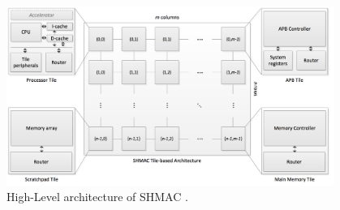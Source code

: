 \begin{figure}[htb]
    \centering
    \includegraphics[width=0.95\textwidth]{Figures/Heterogeneous/SHMAC}
    \caption{High-Level architecture of SHMAC \cite{shmac-plan}.}
    \label{fig:shmac}
\end{figure}




